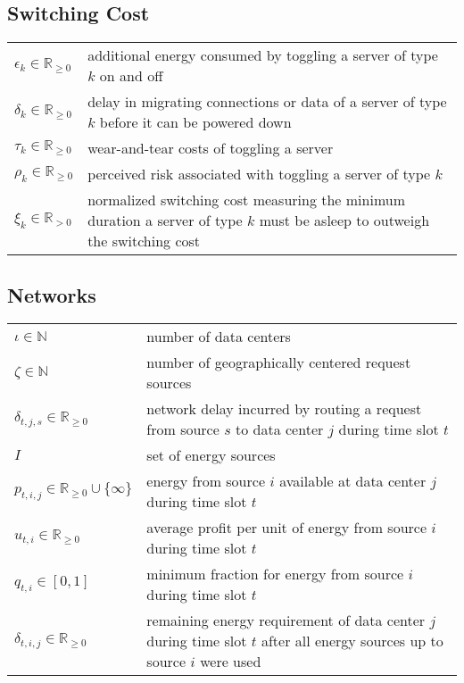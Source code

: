 \subsection*{Switching Cost}

\begin{tabularx}{\textwidth}{lX}
    $\epsilon_k \in \mathbb{R}_{\geq 0}$ & additional energy consumed by toggling a server of type $k$ on and off \\
    $\delta_k \in \mathbb{R}_{\geq 0}$ & delay in migrating connections or data of a server of type $k$ before it can be powered down \\
    $\tau_k \in \mathbb{R}_{\geq 0}$ & wear-and-tear costs of toggling a server \\
    $\rho_k \in \mathbb{R}_{\geq 0}$ & perceived risk associated with toggling a server of type $k$ \\
    $\xi_k \in \mathbb{R}_{>0}$ & normalized switching cost measuring the minimum duration a server of type $k$ must be asleep to outweigh the switching cost \\
\end{tabularx}

\vspace{\fill}

\subsection*{Networks}

\begin{tabularx}{\textwidth}{lX}
    $\iota \in \mathbb{N}$ & number of data centers \\
    $\zeta \in \mathbb{N}$ & number of geographically centered request sources \\
    $\delta_{t,j,s} \in \mathbb{R}_{\geq 0}$ & network delay incurred by routing a request from source $s$ to data center $j$ during time slot $t$ \\
    $I$ & set of energy sources \\
    $p_{t,i,j} \in \mathbb{R}_{\geq 0} \cup \{\infty\}$ & energy from source $i$ available at data center $j$ during time slot $t$ \\
    $u_{t,i} \in \mathbb{R}_{\geq 0}$ & average profit per unit of energy from source $i$ during time slot $t$ \\
    $q_{t,i} \in [0,1]$ & minimum fraction for energy from source $i$ during time slot $t$ \\
    $\delta_{t,i,j} \in \mathbb{R}_{\geq 0}$ & remaining energy requirement of data center $j$ during time slot $t$ after all energy sources up to source $i$ were used \\
\end{tabularx}

